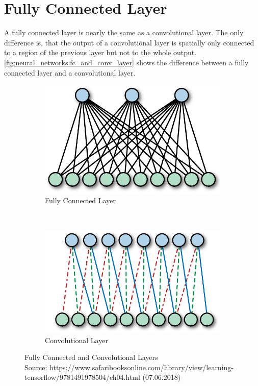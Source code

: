 \section{Fully Connected Layer}
A fully connected layer is nearly the same as a convolutional layer. The only difference is, that the output of a convolutional layer
is spatially only connected to a region of the previous layer but not to the whole output.
\autoref{fig:neural_networks:fc_and_conv_layer} shows the difference between a fully connected layer and a convolutional layer.


\begin{figure}[H]
    \centering
	\begin{subfigure}{0.4\textwidth}
    	\includegraphics[width=0.9\linewidth]{chapters/neural_networks/images/fc_layer.png}		    \caption{Fully Connected Layer}
    	\label{fig:challenges:max_pooling}
	\end{subfigure}~
	\begin{subfigure}{0.4\textwidth}
    	\includegraphics[width=0.9\linewidth]{chapters/neural_networks/images/conv_layer.png}       	\caption{Convolutional Layer}
    	\label{fig:challenges:avg_pooling}
	\end{subfigure}
	\caption{Fully Connected and Convolutional Layers\\Source: https://www.safaribooksonline.com/library/view/learning-tensorflow/9781491978504/ch04.html (07.06.2018)}
	\label{fig:neural_networks:fc_and_conv_layer}
\end{figure}

